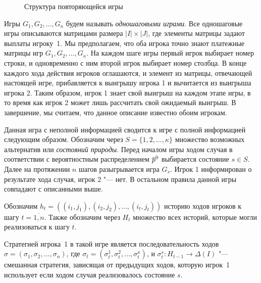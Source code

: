
\begin{figure}[!ht]
  \centering
  
  \caption{Структура повторяющейся игры}
  \label{fig:ch1:game_structure}
\end{figure}

Игры $G_1, G_2, \ldots, G_\kappa$ будем называть \emph{одношаговыми играми}. Все
одношаговые игры описываются матрицами размера $|I| \times |J|$, где элементы
матрицы задают выплаты игроку~1. Мы предполагаем, что оба игрока точно знают
платежные матрицы игр $G_1, G_2, \ldots, G_\kappa$. На каждом шаге игры первый
игрок выбирает номер строки, и одновременно с ним второй игрок выбирает номер
столбца. В конце каждого хода действия игроков оглашаются, и элемент из матрицы,
отвечающей настоящей игре, прибавляется к выигрышу игрока 1 и вычитается из
выигрыша игрока 2. Таким образом, игрок 1 знает свой выигрыш на каждом этапе
игры, в то время как игрок 2 может лишь рассчитать свой ожидаемый выигрыш. В
завершение, мы считаем, что данное описание известно обоим игрокам.

Данная игра с неполной информацией сводится к игре с полной информацией
следующим образом. Обозначим через $S = \{1, 2, \ldots, \kappa\}$ множество
возможных альтернатив или \emph{состояний природы}. Перед началом игры ходом
случая в соответствии с вероятностным распределением $\po$ выбирается состояние
$s \in S$. Далее на протяжении $n$ шагов разыгрывается игра $G_s$. Игрок 1
информирован о результате хода случая, игрок 2 "--- нет. В остальном правила
данной игры совпадают с описанными выше.

Обозначим %
$h_t = \left((i_1, j_1), (i_2, j_2), \ldots, (i_t, j_t)\right)$ %
историю ходов игроков к шагу $t = \overline{1, n}$. Также обозначим через $H_t$
множество всех историй, которые могли реализоваться к шагу $t$. 

Стратегией игрока~1 в такой игре является последовательность ходов %
$\sigma = (\sigma_1, \sigma_2, \ldots, \sigma_n)$, где %
$\sigma_t = (\sigma^1_t, \sigma^2_t, \ldots, \sigma^\kappa_t)$, и %
$\sigma^s_t: H_{t-1} \rightarrow \Delta(I)$ "--- смешанная стратегия, зависящая
от предыдущих ходов, которую игрок~1 использует если ходом случая реализовалось
состояние $s$.

